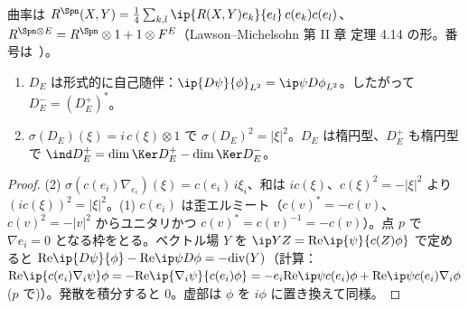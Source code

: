 曲率は $R^{\Spn}(X,Y)=\frac14\sum_{k,l}\ip{R(X,Y)e_k}{e_l}\,c(e_k)c(e_l)$、$R^{\Spn\otimes E}=R^{\Spn}\otimes1+1\otimes F^E$（Lawson--Michelsohn 第 II 章 定理 4.14 の形。番号は\tQ\ ）。
\begin{prop}[基本性質]\label{prop:Diracbasic}
\begin{enumerate}
\item $D_E$ は形式的に自己随伴：$\ip{D\psi}{\phi}_{L^2}=\ip\psi{D\phi}_{L^2}$。したがって $D_E^-=(D_E^+)^*$。\tP
\item $\sigma(D_E)(\xi)=i\,c(\xi)\otimes1$ で $\sigma(D_E)^2=|\xi|^2$。$D_E$ は楕円型、$D_E^+$ も楕円型で $\ind D_E^+=\dim\Ker D_E^+-\dim\Ker D_E^-$。\tP
\end{enumerate}
\end{prop}
\begin{proof}
(2) $\sigma(c(e_i)\nabla_{e_i})(\xi)=c(e_i)\,i\xi_i$、和は $ic(\xi)$、$c(\xi)^2=-|\xi|^2$ より $(ic(\xi))^2=|\xi|^2$。(1) $c(e_i)$ は歪エルミート（$c(v)^*=-c(v)$、$c(v)^2=-|v|^2$ からユニタリかつ $c(v)^*=c(v)^{-1}=-c(v)$）。点 $p$ で $\nabla e_i=0$ となる枠をとる。ベクトル場 $Y$ を $\ip Y Z=\mathrm{Re}\ip{\psi}{c(Z)\phi}$ で定めると $\mathrm{Re}\ip{D\psi}{\phi}-\mathrm{Re}\ip\psi{D\phi}=-\mathrm{div}(Y)$（計算：$\mathrm{Re}\ip{c(e_i)\nabla_i\psi}\phi=-\mathrm{Re}\ip{\nabla_i\psi}{c(e_i)\phi}=-e_i\mathrm{Re}\ip\psi{c(e_i)\phi}+\mathrm{Re}\ip\psi{c(e_i)\nabla_i\phi}$ ($p$ で)）。発散を積分すると $0$。虚部は $\phi$ を $i\phi$ に置き換えて同様。
\end{proof}

